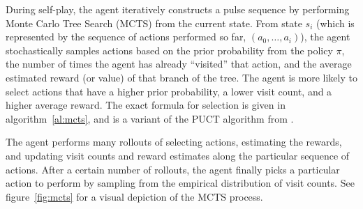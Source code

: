 During self-play, the agent iteratively constructs a pulse sequence by performing Monte Carlo Tree Search (MCTS) from the current state. From state $s_i$ (which is represented by the sequence of actions performed so far, $(a_0, \dots, a_i)$), the agent stochastically samples actions based on the prior probability from the policy $\pi$, the number of times the agent has already ``visited'' that action, and the average estimated reward (or value) of that branch of the tree. The agent is more likely to select actions that have a higher prior probability, a lower visit count, and a higher average reward. The exact formula for selection is given in algorithm~\ref{al:mcts},
and is a variant of the PUCT algorithm from  \cite{Rosin:2011uu}.

The agent performs many rollouts of selecting actions, estimating the rewards, and updating visit counts and reward estimates along the particular sequence of actions. After a certain number of rollouts, the agent finally picks a particular action to perform by sampling from the empirical distribution of visit counts.
See figure~\ref{fig:mcts} for a visual depiction of the MCTS process.

